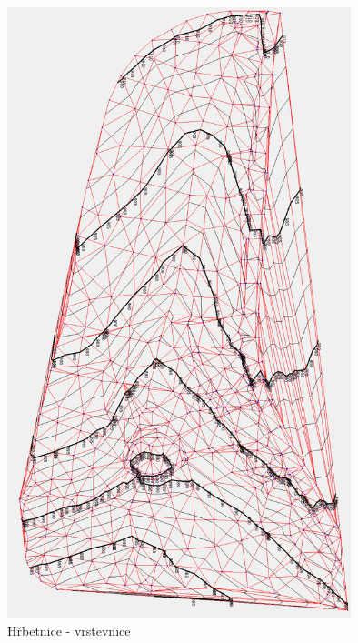 \documentclass[a4paper, 12pt]{article}
\begin{document}
\begin{figure}[h]
	\centering
	\includegraphics[width=10cm]{DMT_vrstevnice.jpg}
	\caption{Hřbetnice - vrstevnice}
\end{figure}
\end{document}
